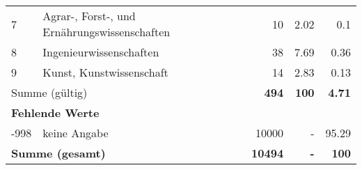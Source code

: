 \begin{longtable}{lXrrr}
     7 &
     \multicolumn{1}{X}{ Agrar-, Forst-, und Ernährungswissenschaften   } &


       \num{10} &
       \num[round-mode=places,round-precision=2]{2,02} &
         \num[round-mode=places,round-precision=2]{0,1} \\

     8 &
     \multicolumn{1}{X}{ Ingenieurwissenschaften   } &


       \num{38} &
       \num[round-mode=places,round-precision=2]{7,69} &
         \num[round-mode=places,round-precision=2]{0,36} \\

     9 &
     \multicolumn{1}{X}{ Kunst, Kunstwissenschaft   } &


       \num{14} &
       \num[round-mode=places,round-precision=2]{2,83} &
         \num[round-mode=places,round-precision=2]{0,13} \\
     \midrule
     \multicolumn{2}{l}{Summe (gültig)} &
       \textbf{\num{494}} &
     \textbf{100} &
       \textbf{\num[round-mode=places,round-precision=2]{4,71}} \\
     \multicolumn{5}{l}{\textbf{Fehlende Werte}}\\
       -998 &
       keine Angabe &
         \num{10000} &
        - &
         \num[round-mode=places,round-precision=2]{95,29} \\
     \midrule
     \multicolumn{2}{l}{\textbf{Summe (gesamt)}} &
          \textbf{\num{10494}} &
        \textbf{-} &
        \textbf{100} \\
     \bottomrule
     \end{longtable}
     
